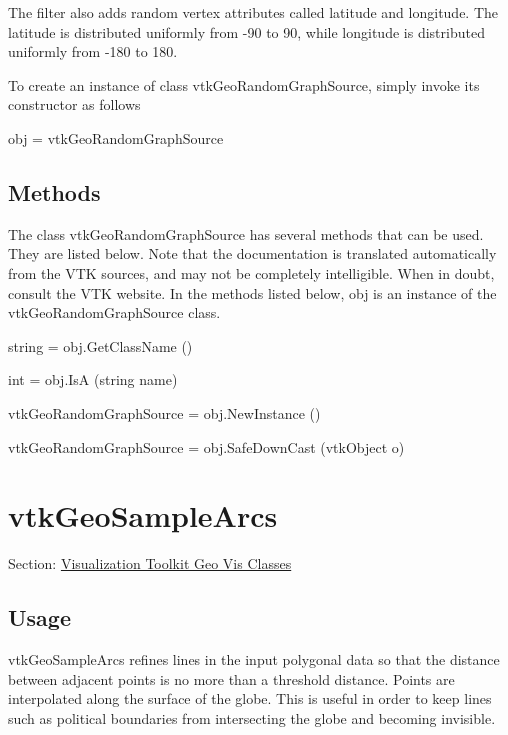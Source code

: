 The filter also adds random vertex attributes called latitude and longitude. The latitude is distributed uniformly from -\/90 to 90, while longitude is distributed uniformly from -\/180 to 180.

To create an instance of class vtk\-Geo\-Random\-Graph\-Source, simply invoke its constructor as follows \begin{DoxyVerb}  obj = vtkGeoRandomGraphSource
\end{DoxyVerb}
 \hypertarget{vtkwidgets_vtkxyplotwidget_Methods}{}\subsection{Methods}\label{vtkwidgets_vtkxyplotwidget_Methods}
The class vtk\-Geo\-Random\-Graph\-Source has several methods that can be used. They are listed below. Note that the documentation is translated automatically from the V\-T\-K sources, and may not be completely intelligible. When in doubt, consult the V\-T\-K website. In the methods listed below, {\ttfamily obj} is an instance of the vtk\-Geo\-Random\-Graph\-Source class. 
\begin{DoxyItemize}
\item {\ttfamily string = obj.\-Get\-Class\-Name ()}  
\item {\ttfamily int = obj.\-Is\-A (string name)}  
\item {\ttfamily vtk\-Geo\-Random\-Graph\-Source = obj.\-New\-Instance ()}  
\item {\ttfamily vtk\-Geo\-Random\-Graph\-Source = obj.\-Safe\-Down\-Cast (vtk\-Object o)}  
\end{DoxyItemize}\hypertarget{vtkgeovis_vtkgeosamplearcs}{}\section{vtk\-Geo\-Sample\-Arcs}\label{vtkgeovis_vtkgeosamplearcs}
Section\-: \hyperlink{sec_vtkgeovis}{Visualization Toolkit Geo Vis Classes} \hypertarget{vtkwidgets_vtkxyplotwidget_Usage}{}\subsection{Usage}\label{vtkwidgets_vtkxyplotwidget_Usage}
vtk\-Geo\-Sample\-Arcs refines lines in the input polygonal data so that the distance between adjacent points is no more than a threshold distance. Points are interpolated along the surface of the globe. This is useful in order to keep lines such as political boundaries from intersecting the globe and becoming invisible.

